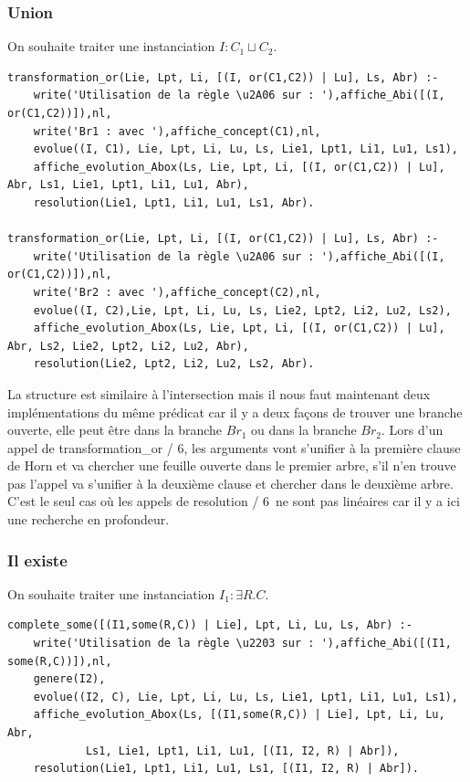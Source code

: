 \documentclass{article}
\begin{document}
\subsubsection{Union}
On souhaite traiter une instanciation $I:C_1\sqcup C_2$.
\begin{verbatim}
transformation_or(Lie, Lpt, Li, [(I, or(C1,C2)) | Lu], Ls, Abr) :- 
	write('Utilisation de la règle \u2A06 sur : '),affiche_Abi([(I, or(C1,C2))]),nl,
	write('Br1 : avec '),affiche_concept(C1),nl,
	evolue((I, C1), Lie, Lpt, Li, Lu, Ls, Lie1, Lpt1, Li1, Lu1, Ls1),
	affiche_evolution_Abox(Ls, Lie, Lpt, Li, [(I, or(C1,C2)) | Lu], Abr, Ls1, Lie1, Lpt1, Li1, Lu1, Abr),
	resolution(Lie1, Lpt1, Li1, Lu1, Ls1, Abr).
	
transformation_or(Lie, Lpt, Li, [(I, or(C1,C2)) | Lu], Ls, Abr) :- 
	write('Utilisation de la règle \u2A06 sur : '),affiche_Abi([(I, or(C1,C2))]),nl,
	write('Br2 : avec '),affiche_concept(C2),nl,
	evolue((I, C2),Lie, Lpt, Li, Lu, Ls, Lie2, Lpt2, Li2, Lu2, Ls2),
	affiche_evolution_Abox(Ls, Lie, Lpt, Li, [(I, or(C1,C2)) | Lu], Abr, Ls2, Lie2, Lpt2, Li2, Lu2, Abr),
	resolution(Lie2, Lpt2, Li2, Lu2, Ls2, Abr).
\end{verbatim}

La structure est similaire à l'intersection mais il nous faut maintenant deux implémentations du même prédicat car il y a deux façons de trouver une branche ouverte, elle peut être dans la branche $Br_1$ ou dans la branche $Br_2$. Lors d'un appel de \color{blue}transformation\_or / 6\color{black}, les arguments vont s'unifier à la première clause de Horn et va chercher une feuille ouverte dans le premier arbre, s'il n'en trouve pas l'appel va s'unifier à la deuxième clause et chercher dans le deuxième arbre. \\

C'est le seul cas où les appels de \color{blue}resolution / 6\color{black}\ ne sont pas linéaires car il y a ici une recherche en profondeur.
\subsubsection{Il existe}
On souhaite traiter une instanciation $I_1:\exists R.C$.
\begin{verbatim}
complete_some([(I1,some(R,C)) | Lie], Lpt, Li, Lu, Ls, Abr) :-
	write('Utilisation de la règle \u2203 sur : '),affiche_Abi([(I1, some(R,C))]),nl,
	genere(I2),
	evolue((I2, C), Lie, Lpt, Li, Lu, Ls, Lie1, Lpt1, Li1, Lu1, Ls1),
	affiche_evolution_Abox(Ls, [(I1,some(R,C)) | Lie], Lpt, Li, Lu, Abr,
            Ls1, Lie1, Lpt1, Li1, Lu1, [(I1, I2, R) | Abr]),
	resolution(Lie1, Lpt1, Li1, Lu1, Ls1, [(I1, I2, R) | Abr]).
\end{verbatim}
\end{document}
